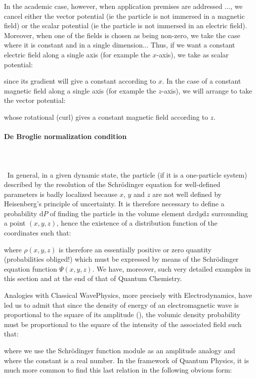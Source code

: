 	In the academic case, however, when application premises are addressed ..., we cancel either the vector potential (ie the particle is not immersed in a magnetic field) or the scalar potential (ie the particle is not immersed in an electric field). Moreover, when one of the fields is chosen as being non-zero, we take the case where it is constant and in a single dimension... Thus, if we want a constant electric field along a single axis (for example the $x$-axis), we take as scalar potential:
	
	since its gradient will give a constant according to $x$. In the case of a constant magnetic field along a single axis (for example the $z$-axis), we will arrange to take the vector potential:
	
	whose rotational (curl) gives a constant magnetic field according to $z$.
	
	\paragraph{De Broglie normalization condition}\mbox{}\\\\\
	In general, in a given dynamic state, the particle (if it is a one-particle system) described by the resolution of the Schrödinger equation for well-defined parameters is badly localized because $x$, $y$ and $z$ are not well defined by Heisenberg's principle of uncertainty. It is therefore necessary to define a probability $\mathrm{d}P$ of finding the particle in the volume element $\mathrm{d}x\mathrm{d}y\mathrm{d}z$ surrounding a point $(x, y, z)$, hence the existence of a distribution function of the coordinates such that:
	
	where $\rho(x,y,z)$ is therefore an essentially positive or zero quantity (probabilities obliged!) which must be expressed by means of the Schrödinger equation function $\Psi(x,y,z)$. We have, moreover, such very detailed examples in this section and at the end of that of Quantum Chemistry.
	
	Analogies with Classical WavePhysics, more precisely with Electrodynamics, have led us to admit that since the density of energy of an electromagnetic wave is proportional to the square of its amplitude (), the volumic density probability must be proportional to the square of the intensity of the associated field such that:
	
	where we use the Schrödinger function module as an amplitude analogy and where the constant is a real number. In the framework of Quantum Physics, it is much more common to find this last relation in the following obvious form:
	
